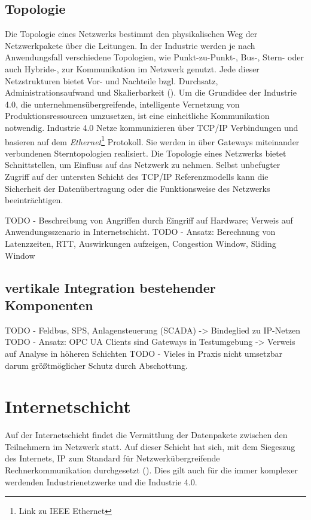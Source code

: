 \subsection{Topologie}
Die Topologie eines Netzwerks bestimmt den physikalischen Weg der Netzwerkpakete über die Leitungen. In der Industrie werden je nach Anwendungsfall verschiedene Topologien, wie Punkt-zu-Punkt-, Bus-, Stern- oder auch Hybride-, zur Kommunikation im Netzwerk genutzt. Jede dieser Netzstrukturen bietet Vor- und Nachteile bzgl. Durchsatz, Administrationsaufwand und Skalierbarkeit (\cite{burke2013}). Um die Grundidee der Industrie 4.0, die unternehmensübergreifende, intelligente Vernetzung von Produktionsressourcen umzusetzen, ist eine einheitliche Kommunikation notwendig. Industrie 4.0 Netze kommunizieren über \ac{TCP}/\ac{IP} Verbindungen und basieren auf dem \textit{Ethernet}\footnote{Link zu IEEE Ethernet} Protokoll. Sie werden in über Gateways miteinander verbundenen Sterntopologien realisiert. Die Topologie eines Netzwerks bietet Schnittstellen, um Einfluss auf das Netzwerk zu nehmen. Selbst unbefugter Zugriff auf der untersten Schicht des \ac{TCP}/\ac{IP} Referenzmodells kann die Sicherheit der Datenübertragung oder die Funktionsweise des Netzwerks beeinträchtigen.

TODO - Beschreibung von Angriffen durch Eingriff auf Hardware; Verweis auf Anwendungsszenario in Internetschicht.
TODO - Ansatz: Berechnung von Latenzzeiten, RTT, Auswirkungen aufzeigen, Congestion Window, Sliding Window

\subsection{vertikale Integration bestehender Komponenten}
TODO - Feldbus, SPS, Anlagensteuerung (SCADA) -> Bindeglied zu IP-Netzen
TODO - Ansatz: OPC UA Clients sind Gateways in Testumgebung -> Verweis auf Analyse in höheren Schichten
TODO - Vieles in Praxis nicht umsetzbar darum größtmöglicher Schutz durch Abschottung.

\section{Internetschicht}
Auf der Internetschicht findet die Vermittlung der Datenpakete zwischen den Teilnehmern im Netzwerk statt. Auf dieser Schicht hat sich, mit dem Siegeszug des Internets, \ac{IP} zum Standard für Netzwerkübergreifende Rechnerkommunikation durchgesetzt (\cite{meinel2011}). Dies gilt auch für die immer komplexer werdenden Industrienetzwerke und die Industrie 4.0.

